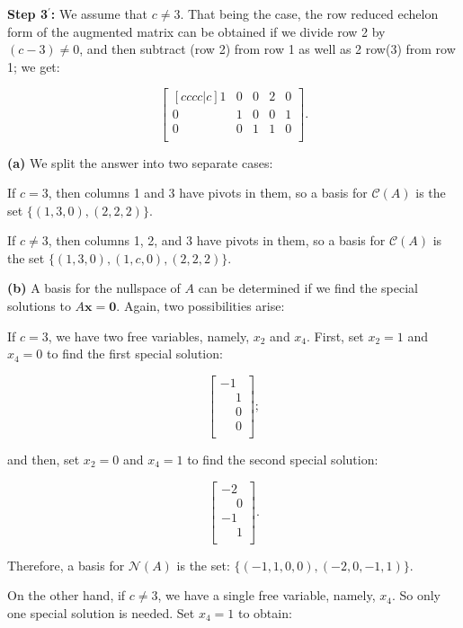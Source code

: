 \documentclass{article}
\begin{document}
\noindent \textbf{Step 3$^{\prime}$:} We assume that $c \neq 3$. That being the case, the row reduced echelon form of the augmented matrix can be obtained if we divide row 2 by $(c-3) \neq 0$, and then subtract (row 2) from row 1 as well as 2 row(3) from row 1; we get:

\[
\begin{bmatrix}[cccc|c]
1 & 0 & 0 & 2 & 0\\
0 & 1 & 0 & 0 & 1\\
0 & 0 & 1 & 1 & 0\\
\end{bmatrix}.
\]

\noindent \textbf{(a)} We split the answer into two separate cases:

If $c = 3$, then columns 1 and 3 have pivots in them, so a basis for $\mathcal{C}(A)$ is the set $\{(1, 3, 0), (2, 2, 2)\}$.

If $c \neq 3$, then columns 1, 2, and 3 have pivots in them, so a basis for $\mathcal{C}(A)$ is the set $\{(1, 3, 0), (1, c, 0), (2, 2, 2)\}$.

\noindent \textbf{(b)} A basis for the nullspace of $A$ can be determined if we find the special solutions to $A\mathbf{x = 0}$. Again, two possibilities arise:

If $c = 3$, we have two free variables, namely, $x_2$ and $x_4$. First, set $x_2 = 1$ and $x_4 = 0$ to find the first special solution:

\[
\begin{bmatrix}
-1\\
\phantom{-}1\\
\phantom{-}0\\
\phantom{-}0\\
\end{bmatrix};
\]

and then, set $x_2 = 0$ and $x_4 = 1$ to find the second special solution:

\[
\begin{bmatrix}
-2\\
\phantom{-}0\\
-1\\
\phantom{-}1\\
\end{bmatrix}.
\]

Therefore, a basis for $\mathcal{N}(A)$ is the set: $\{(-1, 1, 0, 0), (-2, 0, -1, 1)\}$.

On the other hand, if $c \neq 3$, we have a single free variable, namely, $x_4$. So only one special solution is needed. Set $x_4 = 1$ to obtain:
\end{document}
